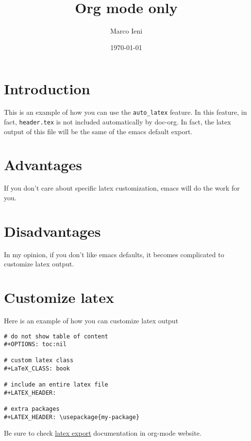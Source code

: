 \documentclass[11pt]{article}
\author{Marco Ieni}
\date{\today}
\title{Org mode only}
\begin{document}
\maketitle
\tableofcontents


\section{Introduction}
\label{sec:org5274384}
This is an example of how you can use the \texttt{auto\_latex} feature.
In this feature, in fact, \texttt{header.tex} is not included automatically by
doc-org.
In fact, the latex output of this file will be the same of the emacs
default export.

\section{Advantages}
\label{sec:org7dcfa26}
If you don't care about specific latex customization, emacs will do the work for
you.

\section{Disadvantages}
\label{sec:org6d20863}
In my opinion, if you don't like emacs defaults, it becomes complicated to
customize latex output.

\section{Customize latex}
\label{sec:org015d33f}
Here is an example of how you can customize latex output
\begin{verbatim}
# do not show table of content
#+OPTIONS: toc:nil

# custom latex class
#+LaTeX_CLASS: book

# include an entire latex file
#+LATEX_HEADER: 

# extra packages
#+LATEX_HEADER: \usepackage{my-package}
\end{verbatim}

Be sure to check \href{https://orgmode.org/manual/LaTeX-Export.html}{latex export} documentation in org-mode website.
\end{document}
